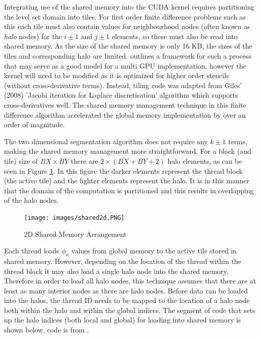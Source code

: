 Integrating use of the shared memory into the CUDA kernel requires partitioning the level set domain into tiles. For first order finite difference problems such as this each tile must also contain values for neighbourhood nodes (often known as \textit{halo} nodes) for the $i\pm1$ and $j\pm1$ elements, so these must also be read into shared memory. As the size of the shared memory is only 16 KB, the sizes of the tiles and corresponding halo are limited. \cite{3dfinitedifference} outlines a framework for such a process that may serve as a good model for a multi GPU implementation, however the kernel will need to be modified as it is optimized for higher order stencils (without cross-derivative terms). Instead, tiling code was adapted from Giles' (2008) 'Jacobi iteration for Laplace discretisation' algorithm \cite{mgiles} which supports cross-derivatives well. The shared memory management technique in this finite difference algorithm accelerated the global memory implementation by over an order of magnitude.

The two dimensional segmentation algorithm does not require any $k\pm1$ terms, making the shared memory management more straightforward. For a block (and tile) size of $BX\times BY$ there are $2 \times (BX + BY +2)$ halo elements, as can be seen in Figure \ref{fig:shared2d}. In this figure the darker elements represent the thread block (the active tile) and the lighter elements represent the halo. It is in this manner that the domain of the computation is partitioned and this results in overlapping of the halo nodes.\\

\begin{figure}[h]
	\centering
		\texttt{[image: images/shared2d.PNG]}
	\caption{2D Shared Memory Arrangement}
	\label{fig:shared2d}
\end{figure}


Each thread loads  $\phi_n$ values from global memory to the active tile stored in shared memory. However, depending on the location of the thread within the thread block it may also load a single halo node into the shared memory. Therefore in order to load all halo nodes, this technique assumes that there are at least as many interior nodes as there are halo nodes. Before data can be loaded into the halos, the thread ID needs to be mapped to the location of a halo node both within the halo and within the global indices. The segment of code that sets up the halo indices (both local and global) for loading into shared memory is shown below, code is from \cite{mgiles}.

